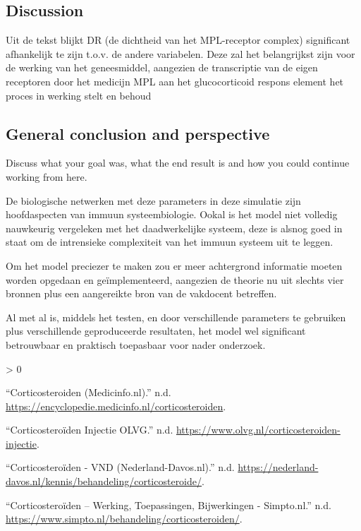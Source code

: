 \documentclass[
]{article}
\newlength{\cslhangindent}
\newenvironment{CSLReferences}[2] %
 {%
  \setlength{\parindent}{0pt}
  \ifodd #1 \everypar{\setlength{\hangindent}{\cslhangindent}}\ignorespaces\fi
  \ifnum #2 > 0
  \setlength{\parskip}{#2\baselineskip}
  \fi
 }%
 {}
\begin{document}
\hypertarget{discussion}{%
\subsection{Discussion}\label{discussion}}

Uit de tekst blijkt DR (de dichtheid van het MPL-receptor complex)
significant afhankelijk te zijn t.o.v. de andere variabelen. Deze zal
het belangrijkst zijn voor de werking van het geneesmiddel, aangezien de
transcriptie van de eigen receptoren door het medicijn MPL aan het
glucocorticoid respons element het proces in werking stelt en behoud

\hypertarget{general-conclusion-and-perspective}{%
\subsection{General conclusion and
perspective}\label{general-conclusion-and-perspective}}

Discuss what your goal was, what the end result is and how you could
continue working from here.

De biologische netwerken met deze parameters in deze simulatie zijn
hoofdaspecten van immuun systeembiologie. Ookal is het model niet
volledig nauwkeurig vergeleken met het daadwerkelijke systeem, deze is
alsnog goed in staat om de intrensieke complexiteit van het immuun
systeem uit te leggen.

Om het model preciezer te maken zou er meer achtergrond informatie
moeten worden opgedaan en geïmplementeerd, aangezien de theorie nu uit
slechts vier bronnen plus een aangereikte bron van de vakdocent
betreffen.

Al met al is, middels het testen, en door verschillende parameters te
gebruiken plus verschillende geproduceerde resultaten, het model wel
significant betrouwbaar en praktisch toepasbaar voor nader onderzoek.

\hypertarget{refs}{}
\begin{CSLReferences}{1}{0}
\leavevmode\hypertarget{ref-B}{}%
{``Corticosteroiden (Medicinfo.nl).''} n.d.
\url{https://encyclopedie.medicinfo.nl/corticosteroiden}.

\leavevmode\hypertarget{ref-A}{}%
{``Corticosteroïden Injectie \textbar{} OLVG.''} n.d.
\url{https://www.olvg.nl/corticosteroiden-injectie}.

\leavevmode\hypertarget{ref-C}{}%
{``Corticosteroïden - VND (Nederland-Davos.nl).''} n.d.
\url{https://nederland-davos.nl/kennis/behandeling/corticosteroide/}.

\leavevmode\hypertarget{ref-D}{}%
{``Corticosteroïden -- Werking, Toepassingen, Bijwerkingen -
Simpto.nl.''} n.d.
\url{https://www.simpto.nl/behandeling/corticosteroiden/}.

\end{CSLReferences}
\end{document}
